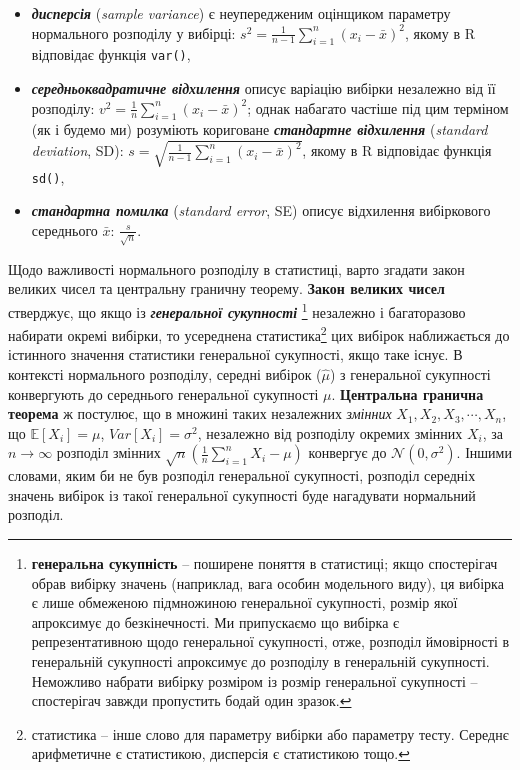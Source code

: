 \documentclass[
  11pt,
]{book}
\begin{document}
\begin{itemize}
\item
  \textbf{\emph{дисперсія}} (\emph{sample variance}) є неупередженим оцінщиком параметру нормального розподілу у вибірці: \(s^2 = \frac{1}{n-1} \sum \limits_{i=1}^n (x_i - \bar{x})^2\), якому в R відповідає функція \texttt{var()},
\item
  \textbf{\emph{середньоквадратичне відхилення}} описує варіацію вибірки незалежно від її розподілу: \(v^2 = \frac{1}{n} \sum \limits_{i=1}^n (x_i - \bar{x})^2\); однак набагато частіше під цим терміном (як і будемо ми) розуміють кориговане \textbf{\emph{стандартне відхилення}} (\emph{standard deviation}, SD): \(s = \sqrt{\frac{1}{n-1} \sum \limits_{i=1}^n (x_i - \bar{x})^2}\), якому в R відповідає функція \texttt{sd()},
\item
  \textbf{\emph{стандартна помилка}} (\emph{standard error}, SE) описує відхилення вибіркового середнього \(\bar{x}\): \(\frac{s}{\sqrt{n}}\).
\end{itemize}

Щодо важливості нормального розподілу в статистиці, варто згадати закон великих чисел та центральну граничну теорему. \textbf{Закон великих чисел} стверджує, що якщо із \textbf{\emph{генеральної сукупності}} \footnote{\textbf{генеральна сукупність} -- поширене поняття в статистиці; якщо спостерігач обрав вибірку значень (наприклад, вага особин модельного виду), ця вибірка є лише обмеженою підмножиною генеральної сукупності, розмір якої апроксимує до безкінечності. Ми припускаємо що вибірка є репрезентативною щодо генеральної сукупності, отже, розподіл ймовірності в генеральній сукупності апроксимує до розподілу в генеральній сукупності. Неможливо набрати вибірку розміром із розмір генеральної сукупності -- спостерігач завжди пропустить бодай один зразок.} незалежно і багаторазово набирати окремі вибірки, то усереднена статистика\footnote{статистика -- інше слово для параметру вибірки або параметру тесту. Середнє арифметичне є статистикою, дисперсія є статистикою тощо.} цих вибірок наближається до істинного значення статистики генеральної сукупності, якщо таке існує. В контексті нормального розподілу, середні вибірок (\(\hat{\mu}\)) з генеральної сукупності конвергують до середнього генеральної сукупності \(\mu\). \textbf{Центральна гранична теорема} ж постулює, що в множині таких незалежних \emph{змінних} \(X_1, X_2, X_3, \cdots, X_n\), що \(\mathbb{E} [X_i] = \mu\), \(Var[X_i] = \sigma^2\), незалежно від розподілу окремих змінних \(X_i\), за \(n \rightarrow \infty\) розподіл змінних \(\sqrt{n} (\frac{1}{n}\sum \limits_{i=1}^n X_i - \mu)\) конвергує до \(\mathcal{N}(0,  \sigma^2)\). Іншими словами, яким би не був розподіл генеральної сукупності, розподіл середніх значень вибірок із такої генеральної сукупності буде нагадувати нормальний розподіл.
\end{document}
